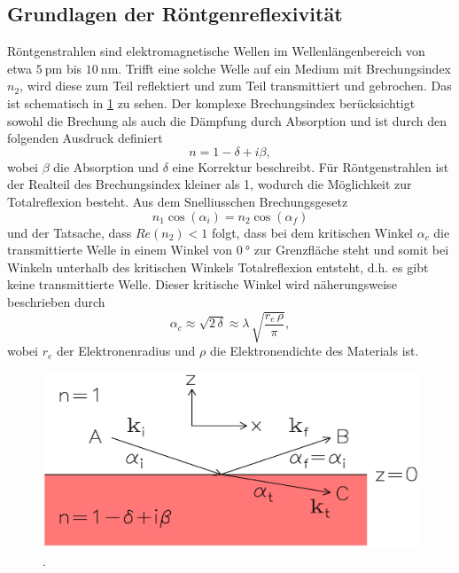 \subsection{Grundlagen der Röntgenreflexivität} %
Röntgenstrahlen sind elektromagnetische Wellen im Wellenlängenbereich von etwa $\SI{5}{\pico\meter}$ bis $\SI{10}{\nano\meter}$.
Trifft eine solche Welle auf ein Medium mit Brechungsindex $n_2$, wird diese zum Teil reflektiert und zum Teil transmittiert und gebrochen. Das ist schematisch in \ref{fig:Brechungsindex} zu sehen. 
Der komplexe Brechungsindex berücksichtigt sowohl die Brechung als auch die Dämpfung durch Absorption und ist durch den folgenden Ausdruck definiert
\begin{equation}
    n = 1 - \delta + i \beta,
\end{equation}
wobei $\beta$ die Absorption und $\delta$ eine Korrektur beschreibt.
Für Röntgenstrahlen ist der Realteil des Brechungsindex kleiner als 1, wodurch die Möglichkeit zur Totalreflexion besteht.
Aus dem Snelliusschen Brechungsgesetz
\begin{equation}
    n_1 \cos(\alpha_i) = n_2 \cos(\alpha_f)
\end{equation}
und der Tatsache, dass $Re(n_2) < 1$ folgt, dass bei dem kritischen Winkel $\alpha_c$ die transmittierte Welle in einem Winkel von $\SI{0}{\degree}$ zur Grenzfläche steht und somit bei Winkeln unterhalb des kritischen Winkels Totalreflexion entsteht, d.h. es gibt keine transmittierte Welle. Dieser kritische Winkel wird näherungsweise beschrieben durch
\begin{equation}
    \alpha_c \approx \sqrt{2 \, \delta} \approx \lambda \, \sqrt{\frac{r_e \, \rho}{\pi}},
\end{equation}
wobei $r_e$ der Elektronenradius und $\rho$ die Elektronendichte des Materials ist.

\begin{figure}
    \centering
    \includegraphics[width=0.7\linewidth]{./figures/Brechungsindex.png}
    \caption{.}
    \label{fig:Brechungsindex}
\end{figure}


